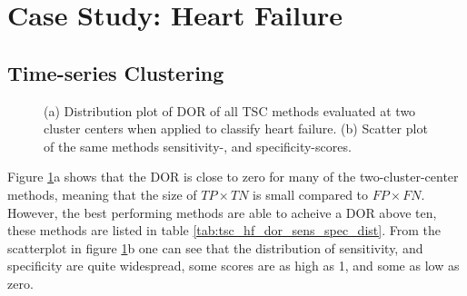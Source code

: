 \section{Case Study: Heart Failure}

\subsection{Time-series Clustering}

\begin{figure}[htb]
    \centering
    
    \caption{(a) Distribution plot of DOR of all TSC methods evaluated at two cluster centers when applied to classify heart failure.
             (b) Scatter plot of the same methods sensitivity-, and specificity-scores.}
    \label{fig:tsc_hf_dor_sens_spec_dist}
\end{figure}

Figure \ref{fig:tsc_hf_dor_sens_spec_dist}a shows that the DOR is close to zero for many of the two-cluster-center methods, 
meaning that the size of $TP \times TN$ is small compared to $FP \times FN$. 
However, the best performing methods are able to acheive a DOR above ten, these methods are listed in table \ref{tab:tsc_hf_dor_sens_spec_dist}.
From the scatterplot in figure \ref{fig:tsc_hf_dor_sens_spec_dist}b one can see that the distribution of sensitivity, and specificity are quite widespread,
some scores are as high as 1, and some as low as zero. 
\bigskip

